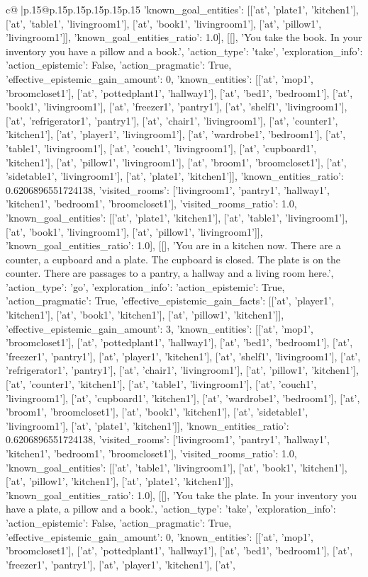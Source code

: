 \documentclass{article}
\begin{document}
{\begin{supertabular}{c@{$\;$}|p{.15\linewidth}@{}p{.15\linewidth}p{.15\linewidth}p{.15\linewidth}p{.15\linewidth}p{.15\linewidth}}
{{{'known_goal_entities': [['at', 'plate1', 'kitchen1'], ['at', 'table1', 'livingroom1'], ['at', 'book1', 'livingroom1'], ['at', 'pillow1', 'livingroom1']], 'known_goal_entities_ratio': 1.0}}], [[], 'You take the book. In your inventory you have a pillow and a book.', {'action_type': 'take', 'exploration_info': {'action_epistemic': False, 'action_pragmatic': True, 'effective_epistemic_gain_amount': 0, 'known_entities': [['at', 'mop1', 'broomcloset1'], ['at', 'pottedplant1', 'hallway1'], ['at', 'bed1', 'bedroom1'], ['at', 'book1', 'livingroom1'], ['at', 'freezer1', 'pantry1'], ['at', 'shelf1', 'livingroom1'], ['at', 'refrigerator1', 'pantry1'], ['at', 'chair1', 'livingroom1'], ['at', 'counter1', 'kitchen1'], ['at', 'player1', 'livingroom1'], ['at', 'wardrobe1', 'bedroom1'], ['at', 'table1', 'livingroom1'], ['at', 'couch1', 'livingroom1'], ['at', 'cupboard1', 'kitchen1'], ['at', 'pillow1', 'livingroom1'], ['at', 'broom1', 'broomcloset1'], ['at', 'sidetable1', 'livingroom1'], ['at', 'plate1', 'kitchen1']], 'known_entities_ratio': 0.6206896551724138, 'visited_rooms': ['livingroom1', 'pantry1', 'hallway1', 'kitchen1', 'bedroom1', 'broomcloset1'], 'visited_rooms_ratio': 1.0, 'known_goal_entities': [['at', 'plate1', 'kitchen1'], ['at', 'table1', 'livingroom1'], ['at', 'book1', 'livingroom1'], ['at', 'pillow1', 'livingroom1']], 'known_goal_entities_ratio': 1.0}}], [[], 'You are in a kitchen now. There are a counter, a cupboard and a plate. The cupboard is closed. The plate is on the counter. There are passages to a pantry, a hallway and a living room here.', {'action_type': 'go', 'exploration_info': {'action_epistemic': True, 'action_pragmatic': True, 'effective_epistemic_gain_facts': [['at', 'player1', 'kitchen1'], ['at', 'book1', 'kitchen1'], ['at', 'pillow1', 'kitchen1']], 'effective_epistemic_gain_amount': 3, 'known_entities': [['at', 'mop1', 'broomcloset1'], ['at', 'pottedplant1', 'hallway1'], ['at', 'bed1', 'bedroom1'], ['at', 'freezer1', 'pantry1'], ['at', 'player1', 'kitchen1'], ['at', 'shelf1', 'livingroom1'], ['at', 'refrigerator1', 'pantry1'], ['at', 'chair1', 'livingroom1'], ['at', 'pillow1', 'kitchen1'], ['at', 'counter1', 'kitchen1'], ['at', 'table1', 'livingroom1'], ['at', 'couch1', 'livingroom1'], ['at', 'cupboard1', 'kitchen1'], ['at', 'wardrobe1', 'bedroom1'], ['at', 'broom1', 'broomcloset1'], ['at', 'book1', 'kitchen1'], ['at', 'sidetable1', 'livingroom1'], ['at', 'plate1', 'kitchen1']], 'known_entities_ratio': 0.6206896551724138, 'visited_rooms': ['livingroom1', 'pantry1', 'hallway1', 'kitchen1', 'bedroom1', 'broomcloset1'], 'visited_rooms_ratio': 1.0, 'known_goal_entities': [['at', 'table1', 'livingroom1'], ['at', 'book1', 'kitchen1'], ['at', 'pillow1', 'kitchen1'], ['at', 'plate1', 'kitchen1']], 'known_goal_entities_ratio': 1.0}}], [[], 'You take the plate. In your inventory you have a plate, a pillow and a book.', {'action_type': 'take', 'exploration_info': {'action_epistemic': False, 'action_pragmatic': True, 'effective_epistemic_gain_amount': 0, 'known_entities': [['at', 'mop1', 'broomcloset1'], ['at', 'pottedplant1', 'hallway1'], ['at', 'bed1', 'bedroom1'], ['at', 'freezer1', 'pantry1'], ['at', 'player1', 'kitchen1'], ['at', }}}
\end{supertabular}}
\end{document}
